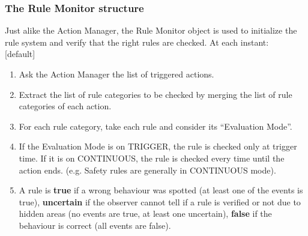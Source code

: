 \documentclass{beamer}
\begin{document}
\begin{frame}

\frametitle{The Rule Monitor structure}
Just alike the Action Manager, the Rule Monitor object is used to initialize
the rule system and verify that the right rules are checked. At each instant:\\

[default]
\begin{enumerate}
\item Ask the Action Manager the list of triggered actions.\\ 
\item Extract the list of rule categories to be checked by merging the
	list of rule categories of each action.
\item For each rule category, take each rule and consider its ``Evaluation Mode''.
\item If the Evaluation Mode is on TRIGGER, the rule is checked only at trigger time. If it is on CONTINUOUS, the rule is checked every time until the action ends. (e.g. Safety rules are generally in CONTINUOUS mode).
\item A rule is \textbf{true} if a wrong behaviour was spotted (at least one of the events is true), \textbf{uncertain} if the observer cannot tell 
if a rule is verified or not due to hidden areas (no events are true, at least one uncertain), \textbf{false} if the behaviour is correct (all events are false).
\end{enumerate}
\end{frame}

\begin{frame}

\end{frame}

\begin{frame}\label{Conclusions}
\end{frame}
\end{document}
